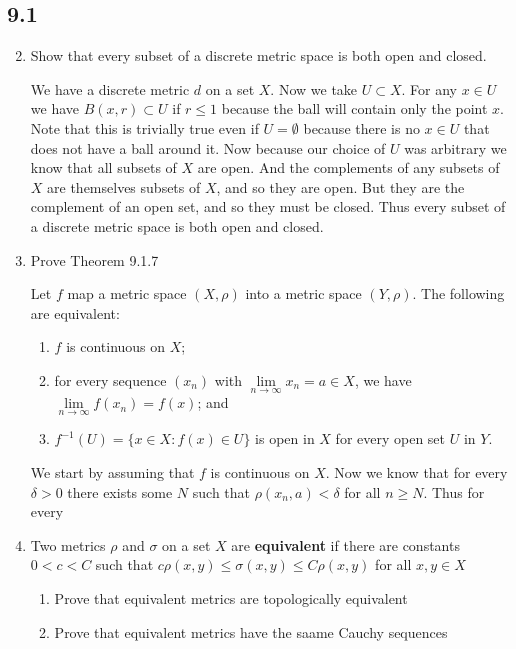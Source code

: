 \documentclass[letterpaper]{article}
\begin{document}
\renewcommand{\labelenumi}{\Alph{enumi}.}
\renewcommand{\labelenumii}{(\alph{enumii})}
\subsection*{9.1}
\begin{enumerate}
\setcounter{enumi}{1}
\item
Show that every subset of a discrete metric space is both open and closed.

We have a discrete metric $d$ on a set $X$. Now we take $U\subset X$. For any $x\in U$ we have $B(x,r)\subset U$ if $r\le 1$ because the ball will contain only the point $x$. Note that this is trivially true even if $U=\emptyset$ because there is no $x\in U$ that does not have a ball around it. Now because our choice of $U$ was arbitrary we know that all subsets of $X$ are open. And the complements of any subsets of $X$ are themselves subsets of $X$, and so they are open. But they are the complement of an open set, and so  they must be closed. Thus every subset of a discrete metric space is both open and closed.
\setcounter{enumi}{3}
\item
Prove Theorem 9.1.7

Let $f$ map a metric space $(X,\rho)$ into a metric space $(Y,\rho)$. The
following are equivalent:
\renewcommand{\labelenumii}{(\arabic{enumii})}
  \begin{enumerate}
    \item
    $f$ is continuous on $X$;
    \item
    for every sequence $(x_n)$ with $\lim\limits_{n\to\infty}x_n=a\in X$, we
    have $\lim\limits_{n\to\infty}f(x_n)=f(x)$; and
    \item
    $f^{-1}(U)=\{x\in X:f(x)\in U\}$ is open in $X$ for every open set $U$ in $Y$.
  \end{enumerate}

  We start by assuming that $f$ is continuous on $X$. Now we know that for every $\delta>0$ there exists some $N$ such that $\rho(x_n,a)<\delta$ for all $n\ge N$. Thus for every 
\renewcommand{\labelenumii}{(\alph{enumii})}
\setcounter{enumi}{7}
\item
Two metrics $\rho$ and $\sigma$ on a set $X$ are {\bf equivalent} if there are
constants $0<c<C$ such that $c\rho(x,y)\le\sigma(x,y)\le C\rho(x,y)$ for all
$x,y\in X$
  \begin{enumerate}
    \item
    Prove that equivalent metrics are topologically equivalent
    \item
    Prove that equivalent metrics have the saame Cauchy sequences


\end{enumerate}
\end{enumerate}
\end{document}
